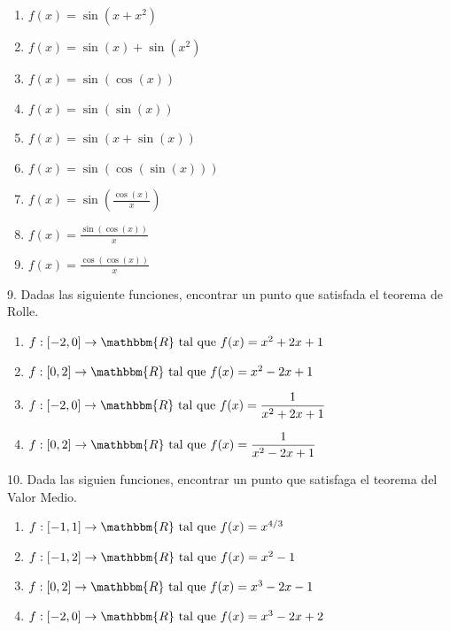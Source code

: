 \documentclass[12pt]{article}
\begin{document}
\begin{enumerate}[\hspace{9px} a)]
    \item \(f(x) = \sin(x+x^2)\)
    \item \(f(x) = \sin(x) + \sin(x^2)\)
    \item \(f(x) = \sin(\cos(x))\)
    \item \(f(x) = \sin(\sin(x))\)
    \item \(f(x) = \sin(x+\sin(x))\)
    \item \(f(x) = \sin(\cos(\sin(x)))\)
    \item \(f(x) = \sin\left(\displaystyle\frac{\cos(x)}{x}\right)\)
    \item \(f(x) = \displaystyle\frac{\sin(\cos(x))}{x}\)
    \item \(f(x) = \displaystyle\frac{\cos(\cos(x))}{x}\)
\end{enumerate}

9. Dadas las siguiente funciones, encontrar un punto que satisfada el teorema de Rolle.

\begin{enumerate}[\hspace{9px} a)]
    \item \(f: [-2,0] \rightarrow \mathbbm{R} \ \text{tal que} \ f(x)=x^2+2x+1\)
    \item \(f: [0,2] \rightarrow \mathbbm{R} \ \text{tal que} \ f(x)=x^2-2x+1\)
    \item \(f: [-2,0] \rightarrow \mathbbm{R} \ \text{tal que} \ f(x)=\displaystyle\frac{1}{x^2+2x+1}\)
    \item \(f: [0,2] \rightarrow \mathbbm{R} \ \text{tal que} \ f(x)=\displaystyle\frac{1}{x^2-2x+1}\)
\end{enumerate}

10. Dada las siguien funciones, encontrar un punto que satisfaga el teorema del Valor Medio.

\begin{enumerate}[\hspace{9px} a)]
    \item \(f: [-1,1] \rightarrow \mathbbm{R} \ \text{tal que} \ f(x)=x^{4/3}\)
    \item \(f: [-1,2] \rightarrow \mathbbm{R} \ \text{tal que} \ f(x)=x^2-1\)
    \item \(f: [0,2] \rightarrow \mathbbm{R} \ \text{tal que} \ f(x)=x^3-2x-1\)
    \item \(f: [-2,0] \rightarrow \mathbbm{R} \ \text{tal que} \ f(x)=x^3-2x+2\)
\end{enumerate}
\end{document}
